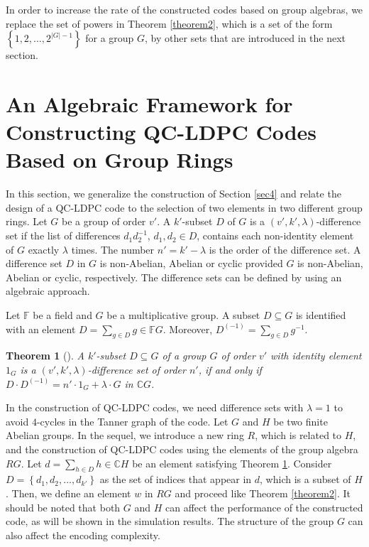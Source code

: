 \documentclass[journal,draftclsnofoot,onecolumn,12pt,twoside]{IEEEtran}
\newtheorem{theorem}{Theorem}
\begin{document}


In order to increase the rate of the constructed codes based on  group algebras, we replace the set of powers in  Theorem \ref{theorem2}, which is a set of the form $\left\lbrace1,2,\ldots ,2^{|G|-1}\right\rbrace$ for a group $G$, by other sets that are introduced in the next section.
\section{An Algebraic Framework for Constructing QC-LDPC Codes Based on Group Rings}\label{sec5}
In this section, we generalize the construction of Section \ref{sec4} and relate the design of a QC-LDPC code to the selection of two elements in two different group rings. Let $G$ be a group of order $v'$. A $k'$-subset $D$ of $G$ is  a $(v', k', \lambda)$-difference set if the list of differences $d_1d_2^{-1}$, $d_1,d_2 \in D$, contains each non-identity element of $G$ exactly $\lambda$ times. The number $n' = k'-\lambda$ is the order of the difference set. A difference set $D$ in $G$ is  non-Abelian, Abelian or cyclic provided $G$ is non-Abelian, Abelian or cyclic, respectively. The difference sets can be defined by using an algebraic approach.

Let $\mathbb{F}$ be a field and $G$ be  a multiplicative group. A subset $D\subseteq G$ is identified with an element $D=\sum_{g\in D} g\in \mathbb{F}G$. Moreover, $D^{(-1)}=\sum_{g\in D} g^{-1}$.
\begin{theorem}[\emph{\cite[Theorem 18.19]{17}}]\label{theorem3}
A $k'$-subset $D \subseteq G$ of a group $G$ of order $v'$ with identity element $1_G$ is a $(v', k', \lambda)$-difference set of order $n'$, if and only if $D \cdot D^{(-1)} = n' \cdot 1_G + \lambda \cdot G$ in $\mathbb{C}G$.
\end{theorem}


In the construction of QC-LDPC codes, we need  difference sets with $\lambda=1$  to avoid $4$-cycles in the Tanner graph of the code. Let $G$ and $H$ be two finite Abelian groups.
In the sequel, we introduce a new ring $R$, which is related to $H$, and the construction of QC-LDPC codes  using the elements of the group algebra $RG$. Let $d=\sum_{h\in D} h\in \mathbb{C}H$ be an element satisfying Theorem \ref{theorem3}. Consider $D=\left\lbrace d_1,d_2,\ldots ,d_{k'}\right\rbrace$ as the set of  indices that appear in $d$, which is a subset of $H$. Then, we define an element $w$ in $RG$ and proceed like Theorem \ref{theorem2}. It should be noted that both $G$ and  $H$ can affect the performance of the constructed code, as will be shown in the simulation results. The structure of the group $G$ can also affect the encoding complexity.
\end{document}
